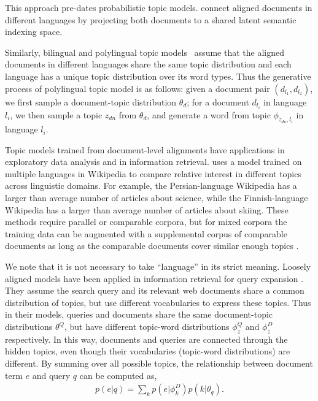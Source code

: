 This approach pre-dates probabilistic topic models.
\citet{Landauer-1990} connect aligned documents in different languages
by projecting both documents to a shared latent semantic indexing
space.

Similarly, bilingual \citep{zhao-06} and polylingual topic models~\citep[\plda{}]{mimno-09}
assume that the aligned documents in different languages share the
same topic distribution and each language has a unique topic
distribution over its word types.
Thus the generative process of polylingual topic model is as follows:
given a document pair $(d_{l_1}, d_{l_2})$, we first sample a
document-topic distribution $\theta_d$; for a document $d_{l_i}$ in
language $l_i$, we then sample a topic $z_{dn}$ from $\theta_d$, and
generate a word from topic $\phi_{z_{dn}, l_i}$ in language $l_i$.

Topic models trained from document-level alignments have applications in exploratory data analysis and in information retrieval.
\cite{mimno-09} uses a model trained on multiple languages in Wikipedia to compare relative interest in different topics across linguistic domains.
For example, the Persian-language Wikipedia has a larger than average number of articles about science, while the Finnish-language Wikipedia has a larger than average number of articles about skiing.
These methods require parallel or comparable corpora, but for mixed corpora the training data can be augmented with a supplemental corpus of comparable documents as long as  the comparable documents cover similar enough topics \citep{mimno-12b}.
 
We note that it is not necessary to take ``language'' in its strict meaning.
Loosely aligned models have been applied in information retrieval for query expansion \citep{Gao-2011,Gao-2012}. They assume the search
query and its relevant web documents share a common distribution of
topics, but use different vocabularies to express these topics. Thus
in their models, queries and documents share the same document-topic
distributions $\theta^Q$, but have different topic-word distributions
$\phi_z^Q$ and $\phi_z^D$ respectively.
In this way, documents and queries are
connected through the hidden topics, even though their vocabularies
(topic-word distributions) are different. By summing over all possible
topics, the relationship between document term $e$ and query $q$ can
be computed as,
\begin{align}
p(e|q) = \sum_k p(e|\phi_k^D) p(k | \theta_q).
\end{align}

